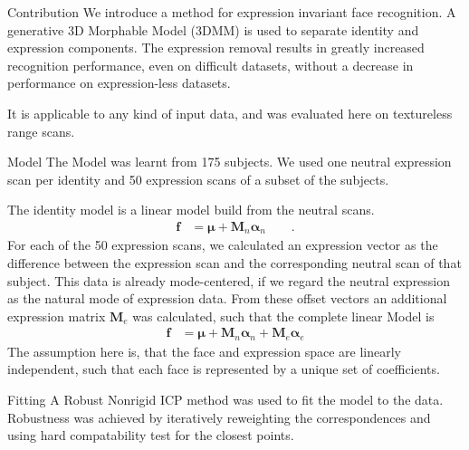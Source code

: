 \documentclass[a0paper,landscape,final]{baposter}
\newcommand*{\MAT}[1]  {\ensuremath{\mathbf{#1}}}
\newcommand*{\VEC}[1]  {\ensuremath{\bm{#1}}}
\begin{document}
\begin{poster}
  \begin{posterbox}[name=contribution,column=0,row=0]{Contribution}
   {}We introduce a method for expression invariant face recognition. A
   generative 3D Morphable Model (3DMM) is used to separate identity and
   expression components. The expression removal results in greatly increased
   recognition performance, even on difficult datasets, without a decrease in
   performance on expression-less datasets.

   It is applicable to any kind of input data, and was evaluated here on
   textureless range scans.
 \end{posterbox}

  \begin{posterbox}[name=model,column=0,below=contribution]{Model}
    The Model was learnt from 175 subjects. We used one neutral expression scan
    per identity and 50 expression scans of a subset of the subjects. 

    The identity model is a linear model build from the neutral scans.
    \begin{align}
      \VEC f&=\VEC\mu + \MAT M_n\VEC\alpha_n\qquad.
    \end{align}
    For each of the 50 expression scans, we calculated an expression vector as
    the difference between the expression scan and the corresponding neutral
    scan of that subject.  This data is already mode-centered, if we regard the
    neutral expression as the natural mode of expression data. From these offset
    vectors an additional expression matrix $\MAT M_e$ was calculated, such that the complete linear Model is
    \begin{align}
      \VEC f&=\VEC\mu + \MAT M_n\VEC\alpha_n + \MAT M_e\VEC\alpha_e
    \end{align}
    The assumption here is, that the face and expression space are linearly
    independent, such that each face is represented by a unique set of
    coefficients.  
  \end{posterbox}

  \begin{posterbox}[name=fitting,column=0,below=model]{Fitting}
    A Robust Nonrigid ICP method was used to fit the model to the data.
    Robustness was achieved by iteratively reweighting the correspondences and
    using hard compatability test for the closest points.


\end{posterbox}
\end{poster}
\end{document}
